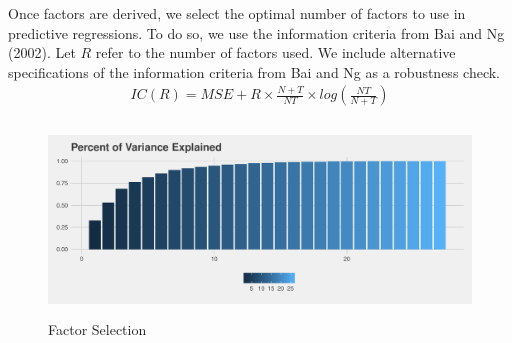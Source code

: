 \documentclass[11pt, letterpaper]{article}\usepackage[]{graphicx}\usepackage[]{color}
\begin{document}
Once factors are derived, we select the optimal number of factors to use in predictive regressions. To do so, we use the information criteria from Bai and Ng (2002). Let $R$ refer to the number of factors used. We include alternative specifications of the information criteria from Bai and Ng as a robustness check.
\begin{align*}
	IC(R) = MSE + R \times \frac{N+T}{NT} \times log\left(\frac{NT}{N+T}\right)
\end{align*}

\begin{figure}[H]

{\centering \includegraphics[width=5in,height=2in]{figure/unnamed-chunk-7-1} 

}

\caption[Factor Selection]{Factor Selection}\label{fig:unnamed-chunk-7}
\end{figure}
\end{document}
